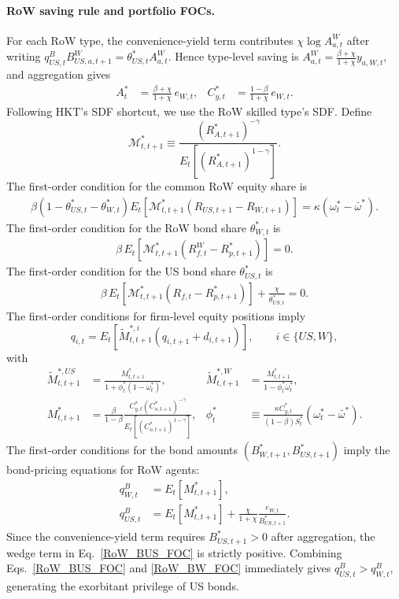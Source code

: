 \documentclass{article}
\begin{document}
\paragraph{RoW saving rule and portfolio FOCs.}
For each RoW type, the convenience-yield term contributes $\chi\log A^W_{a,t}$ after writing $q^B_{US,t}B^W_{US,a,t+1}=\theta_{US,t}^*A^W_{a,t}$. Hence type-level saving is $A^W_{a,t}=\frac{\beta+\chi}{1+\chi}y_{a,W,t}$, and aggregation gives
\begin{align}\label{RoW_saving_rule_bond_cost}
A_t^*&=\frac{\beta+\chi}{1+\chi}\,e_{W,t},
&
C^*_{y,t}&=\frac{1-\beta}{1+\chi}\,e_{W,t}.
\end{align}
Following HKT's SDF shortcut, we use the RoW skilled type's SDF. Define
\[
\mathcal M_{t,t+1}^* \equiv \frac{(R_{A,t+1}^*)^{-\gamma}}{E_t\!\left[(R_{A,t+1}^*)^{1-\gamma}\right]}.
\]
The first-order condition for the common RoW equity share is
\begin{align}\label{RoW_omega_FOC_mod}
\beta(1-\theta_{US,t}^*-\theta_{W,t}^*)
E_t\!\left[\mathcal M_{t,t+1}^*(R_{US,t+1}-R_{W,t+1})\right]
=
\kappa(\omega_t^*-\bar\omega^*).
\end{align}
The first-order condition for the RoW bond share $\theta_{W,t}^*$ is
\begin{align}\label{RoW_thetaW_FOC_mod}
\beta\,E_t\!\left[\mathcal M_{t,t+1}^*(R_{f,t}^W-R_{p,t+1}^*)\right]
=
0.
\end{align}
The first-order condition for the US bond share $\theta_{US,t}^*$ is
\begin{align}\label{RoW_thetaUS_FOC_mod}
\beta\,E_t\!\left[\mathcal M_{t,t+1}^*(R_{f,t}-R_{p,t+1}^*)\right]
+\frac{\chi}{\theta_{US,t}^*}
=
0.
\end{align}
The first-order conditions for firm-level equity positions imply
\begin{equation}\label{RoW_stock_pricing}
q_{i,t}
=
E_t\!\left[\tilde M^{*,i}_{t,t+1}(q_{i,t+1}+d_{i,t+1})\right],
\qquad i\in\{US,W\},
\end{equation}
with
\begin{align*}
\tilde M^{*,US}_{t,t+1}&=\frac{M^*_{t,t+1}}{1+\phi_t^*(1-\omega_t^*)},
&
\tilde M^{*,W}_{t,t+1}&=\frac{M^*_{t,t+1}}{1-\phi_t^*\omega_t^*},\\
M^*_{t,t+1}
&=\frac{\beta}{1-\beta}
\frac{C^*_{y,t}(C^*_{o,t+1})^{-\gamma}}{E_t\!\left[(C^*_{o,t+1})^{1-\gamma}\right]},
&
\phi_t^*
&\equiv \frac{\kappa C^*_{y,t}}{(1-\beta)S_t^*}(\omega_t^*-\bar\omega^*).
\end{align*}
The first-order conditions for the bond amounts $(B_{W,t+1}^*,B_{US,t+1}^*)$ imply the bond-pricing equations for RoW agents:
\begin{align}
q^B_{W,t}&=E_t\!\left[M^*_{t,t+1}\right], \label{RoW_BW_FOC}\\
q^B_{US,t}&=E_t\!\left[M^*_{t,t+1}\right]
+\frac{\chi}{1+\chi} \frac{e_{W,t}}{B^*_{US,t+1}}. \label{RoW_BUS_FOC}
\end{align}
Since the convenience-yield term requires $B^*_{US,t+1}>0$ after aggregation, the wedge term in Eq.~\eqref{RoW_BUS_FOC} is strictly positive. Combining Eqs.~\eqref{RoW_BUS_FOC} and \eqref{RoW_BW_FOC} immediately gives $q^B_{US,t}>q^B_{W,t}$, generating the exorbitant privilege of US bonds.
\end{document}
